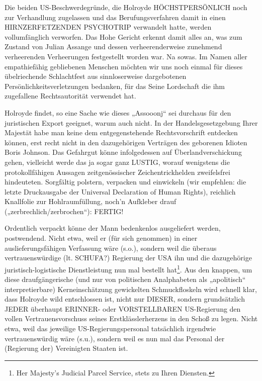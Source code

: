 \begin{multicols}{2}
Die beiden US-Beschwerdegründe, die Holroyde
HÖCHSTPERSÖNLICH noch zur Verhandlung zugelassen und das Berufungsverfahren damit in einen
HIRNZERFETZENDEN PSYCHOTRIP verwandelt hatte,
werden vollumfänglich verworfen. Das Hohe Gericht erkennt damit alles an, was zum Zustand von Julian Assange und dessen verheerenderweise zunehmend verheerenden Verheerungen festgestellt worden war. Na sowas.
Im Namen aller empathiefähig gebliebenen Menschen
möchten wir uns noch einmal für dieses übelriechende
Schlachtfest aus sinnloserweise dargebotenen Persönlichkeitsverletzungen bedanken, für das Seine Lordschaft die ihm zugefallene Rechtsautorität verwendet
hat.

Holroyde findet, so eine Sache wie dieses „Assooonj“
sei durchaus für den juristischen Export geeignet, warum auch nicht. In der Handelsgesetzgebung Ihrer Majestät habe man keine dem entgegenstehende Rechtsvorschrift entdecken können, erst recht nicht in den
dazugehörigen Verträgen des geborenen Idioten Boris Johnson. Das Gefahrgut könne infolgedessen auf Überlandverschickung gehen, vielleicht werde das ja sogar
ganz LUSTIG, worauf wenigstens die protokollfähigen
Aussagen zeitgenössischer Zeichentrickhelden zweifelsfrei hindeuteten. Sorgfältig polstern, verpacken und
einwickeln (wir empfehlen: die letzte Druckausgabe der
Universal Declaration of Human Rights), reichlich Knallfolie zur Hohlraumfüllung, noch’n Aufkleber drauf („zerbrechlich/zerbrochen“): FERTIG!

Ordentlich verpackt könne der Mann bedenkenlos ausgeliefert werden, postwendend. Nicht etwa, weil er (für
sich genommen) in einer auslieferungsfähigen Verfassung wäre (s.o.), sondern weil die überaus vertrauenswürdige (lt. SCHUFA?) Regierung der USA ihn und die
dazugehörige juristisch-logistische Dienstleistung nun
mal bestellt hat\footnote[29]{Her Majesty’s Judicial Parcel Service, stets zu Ihren Diensten.}. 
Aus den knappen, um diese draufgängerische (und nur von politischen Analphabeten
als „apolitisch“ interpretierbare) Kerneinschätzung gewickelten Schmuckfloskeln wird schnell klar, dass Holroyde wild entschlossen ist, nicht nur DIESER, sondern
grundsätzlich JEDER überhaupt ERINNER- oder VORSTELLBAREN US-Regierung den vollen Vertrauensvorschuss seines Erstklässlerherzens in den Schoß zu legen.
Nicht etwa, weil das jeweilige US-Regierungspersonal
tatsächlich irgendwie vertrauenswürdig wäre (s.u.), sondern weil es nun mal das Personal der (Regierung der)
Vereinigten Staaten ist.


\end{multicols}
